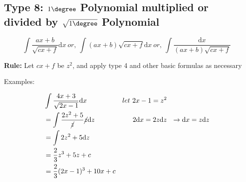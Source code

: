      \subsection{Type 8: $1\degree$ Polynomial multiplied or divided by $\sqrt{1\degree}$ Polynomial}

      \begin{equation}
        \int \frac{ax + b}{\sqrt{cx + f}} \mathrm{d}x \ or, \ \int (ax + b)\sqrt{cx + f} \mathrm{d}x \ or, \ \int \frac{\mathrm{d}x}{(ax + b)\sqrt{cx + f}}
      \end{equation}

      \begin{center}
        \textbf{Rule:} Let $cx + f$ be $z^{2}$, and apply type 4 and other basic formulas as necessary
      \end{center}

      Examples:

      \begin{align*}
        & \int \frac{4x + 3}{\sqrt{2x - 1}} \mathrm{d}x & let\ 2x - 1 = z^{2}\ &\\
        & = \int \frac{2z^{2} + 5}{\cancel{z}} \cancel{z}\mathrm{d}z & 2\mathrm{d}x = 2z\mathrm{d}z\ &\ \rightarrow \mathrm{d}x = z\mathrm{d}z \\
        & = \int 2z^{2} + 5 \mathrm{d}z &&\\
        & = \frac{2}{3} z^{3} + 5z + c && \\
        & = \frac{2}{3} (2x - 1)^{3} + 10x + c &&
      \end{align*}
